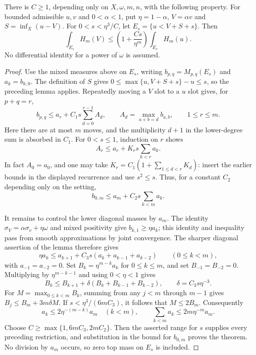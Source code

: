 \begin{theorem}\label{draft637:modified-comparison}
There is $C\geq1$, depending only on $X,\omega,m,n$, with the
following property. For bounded admissible $u,v$ and $0<\alpha<1$,
put $\eta=1-\alpha$, $V=\alpha v$ and $S=\inf_X(u-V)$.
For $0<s<\eta^3/C$, let $E_s=\{u<V+S+s\}$. Then
\[
 \int_{E_s}H_m(V)
       \leq\left(1+\frac{Cs}{\eta^m}\right)
                                  \int_{E_s}H_m(u).
\]
No differential identity for a power of $\omega$ is assumed.
\end{theorem}
\begin{proof}
Use the mixed measures above on $E_s$, writing
$b_{p,q}=M_{p,q}(E_s)$ and $a_k=b_{k,0}$.
The definition of $S$ gives
$0\leq\max\{u,V+S+s\}-u\leq s$, so the preceding lemma applies.
Repeatedly moving a $V$ slot to a $u$ slot gives, for $p+q=r$,
\[
 b_{p,q}\leq a_r+C_1s\sum_{d=0}^{r-1}A_d,
 \qquad A_d=\max_{a+b=d}b_{a,b},\qquad 1\leq r\leq m.
\]
Here there are at most $m$ moves, and the multiplicity $d+1$
in the lower-degree sum is absorbed in $C_1$.
For $0<s\leq1$, induction on $r$ shows
\[
 A_r\leq a_r+K_rs\sum_{k<r}a_k.
\]
In fact $A_0=a_0$, and one may take
$K_r=C_1(1+\sum_{1\leq d<r}K_d)$: insert the earlier bounds
in the displayed recurrence and use $s^2\leq s$.
Thus, for a constant $C_2$ depending only on the setting,
\[
 b_{0,m}\leq a_m+C_2s\sum_{k<m}a_k.
\]

It remains to control the lower diagonal masses by $a_m$.
The identity $\sigma_V=\alpha\sigma_v+\eta\omega$ and mixed
positivity give $b_{k,1}\geq\eta a_k$; this identity and
inequality pass from smooth approximations by joint convergence.
The sharper diagonal assertion of the lemma therefore gives
\[
 \eta a_k\leq a_{k+1}
          +C_3s(a_k+a_{k-1}+a_{k-2})\qquad(0\leq k<m),
\]
with $a_{-1}=a_{-2}=0$.
Set $B_k=\eta^{m-k}a_k$ for $0\leq k\leq m$, and set
$B_{-1}=B_{-2}=0$. Multiplying by $\eta^{m-k-1}$ and using
$0<\eta<1$ gives
\[
 B_k\leq B_{k+1}
          +\delta(B_k+B_{k-1}+B_{k-2}),
 \qquad\delta=C_3s\eta^{-3}.
\]
For $M=\max_{0\leq k<m}B_k$, summing from any $j<m$ through
$m-1$ gives $B_j\leq B_m+3m\delta M$.
If $s<\eta^3/(6mC_3)$, it follows that $M\leq2B_m$.
Consequently
\[
 a_k\leq2\eta^{-(m-k)}a_m\quad(k<m),\qquad
 \sum_{k<m}a_k\leq2m\eta^{-m}a_m.
\]
Choose $C\geq\max\{1,6mC_3,2mC_2\}$. Then the asserted
range for $s$ supplies every preceding restriction, and substitution
in the bound for $b_{0,m}$ proves the theorem.
No division by $a_m$ occurs, so zero top mass on $E_s$ is included.
\end{proof}

